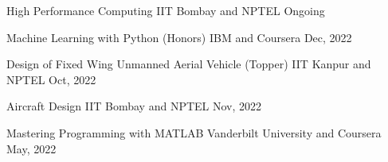 

\begin{cvhonors}
  \cvhonor
  {High Performance Computing} %
  {IIT Bombay and NPTEL} %
  {} %
  {Ongoing} %

  \cvhonor
  {Machine Learning with Python (Honors)} %
  {IBM and Coursera} %
  {} %
  {Dec, 2022} %


  \cvhonor
  {Design of Fixed Wing Unmanned Aerial Vehicle (Topper)} %
  {IIT Kanpur and NPTEL} %
  {} %
  {Oct, 2022} %


  \cvhonor
  {Aircraft Design} %
  {IIT Bombay and NPTEL} %
  {} %
  {Nov, 2022} %


  \cvhonor
  {Mastering Programming with MATLAB} %
  {Vanderbilt University and Coursera} %
  {} %
  {May, 2022} %

\end{cvhonors}
